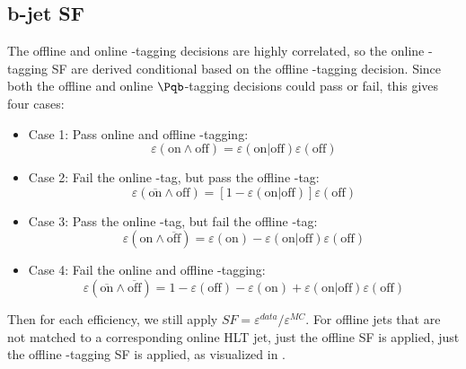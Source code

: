 \subsection{b-jet SF}
\label{subsec:trig-sf-bjet}

The offline and online \Pqb-tagging decisions are highly correlated, so the online \Pqb-tagging SF are derived conditional based on the offline \Pqb-tagging decision. 
Since both the offline and online $\Pqb$-tagging decisions could pass or fail, this gives four cases:

\begin{itemize}
\setlength\itemsep{-1.5em}
   \item Case 1: Pass online and offline \Pqb-tagging: 
   	\vspace{-1em}
	  \begin{equation*}
		 \varepsilon(\text{on} \land \text{off}) 
		 = \varepsilon(\text{on} | \text{off}) \varepsilon(\text{off})
	  \end{equation*}
   \item Case 2: Fail the online \Pqb-tag, but pass the offline \Pqb-tag: 
   	\vspace{-1em}
	  \begin{equation*}
		 \varepsilon(\overline{\text{on}} \land \text{off}) 
		 = [1 - \varepsilon(\text{on} | \text{off})] \varepsilon(\text{off})
	  \end{equation*}
   \item Case 3: Pass the online \Pqb-tag, but fail the offline \Pqb-tag: 
   	\vspace{-1em}
	  \begin{equation*}
		 \varepsilon(\text{on} \land \overline{\text{off}}) 
		 = \varepsilon(\text{on}) - \varepsilon(\text{on} | \text{off}) \varepsilon(\text{off})
	  \end{equation*}
   \item Case 4: Fail the online and offline \Pqb-tagging: 
   	\vspace{-1em}
	  \begin{equation*}
		 \varepsilon(\overline{\text{on}} \land \overline{\text{off}}) 
		 = 1 - \varepsilon(\text{off}) - \varepsilon(\text{on}) + \varepsilon(\text{on} | \text{off}) \varepsilon(\text{off})
	  \end{equation*}
\end{itemize}

Then for each efficiency, we still apply $SF = \varepsilon^{data} / \varepsilon^{MC}$.
For offline jets that are not matched to a corresponding online HLT jet, just the offline SF is applied, just the offline \Pqb-tagging SF is applied, as visualized in \Fig{\ref{fig:ftag-online-sf}}.

